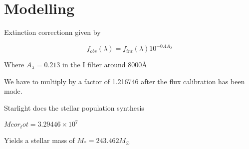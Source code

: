 \chapter{Modelling}

Extinction correctionn given by

\begin{equation}
f_{obs}(\lambda)=f_{int}(\lambda)10^{-0.4A_{\lambda}}
\end{equation}

Where $A_{\lambda}=0.213$ in the I filter around $8000 \textrm{\AA}$

We have to multiply by a factor of 1.216746 after the flux calibration has been made.

Starlight does the stellar population synthesis 

$Mcor_tot = 3.29446 \times 10^{7}$

Yields a stellar mass of $M_{*}=243.462M_{\odot}$

